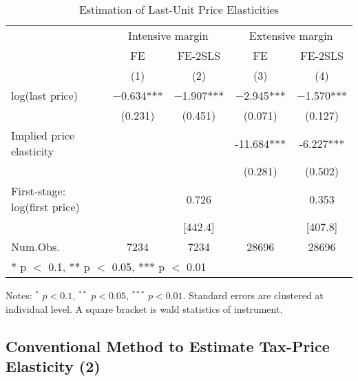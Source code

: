 \documentclass[
  11pt,
  a4paper,
]{article}
\begin{document}
\begin{table}

\caption{\label{tab:MainElasticity}Estimation of Last-Unit Price Elasticities}
\centering
\fontsize{7}{9}\selectfont
\begin{threeparttable}
\begin{tabular}[t]{lcccc}
\toprule
\multicolumn{1}{c}{ } & \multicolumn{2}{c}{Intensive margin} & \multicolumn{2}{c}{Extensive margin} \\
\cmidrule(l{3pt}r{3pt}){2-3} \cmidrule(l{3pt}r{3pt}){4-5}
\multicolumn{1}{c}{ } & \multicolumn{1}{c}{FE} & \multicolumn{1}{c}{FE-2SLS} & \multicolumn{1}{c}{FE} & \multicolumn{1}{c}{FE-2SLS} \\
\cmidrule(l{3pt}r{3pt}){2-2} \cmidrule(l{3pt}r{3pt}){3-3} \cmidrule(l{3pt}r{3pt}){4-4} \cmidrule(l{3pt}r{3pt}){5-5}
  & (1) & (2) & (3) & (4)\\
\midrule
log(last price) & \num{-0.634}*** & \num{-1.907}*** & \num{-2.945}*** & \num{-1.570}***\\
 & (\num{0.231}) & (\num{0.451}) & (\num{0.071}) & (\num{0.127})\\
\midrule
Implied price elasticity &  &  & -11.684*** & -6.227***\\
 &  &  & (0.281) & (0.502)\\
First-stage: log(first price) &  & 0.726 &  & 0.353\\
 &  & {}[442.4] &  & {}[407.8]\\
Num.Obs. & \num{7234} & \num{7234} & \num{28696} & \num{28696}\\
\bottomrule
\multicolumn{5}{l}{\rule{0pt}{1em}* p $<$ 0.1, ** p $<$ 0.05, *** p $<$ 0.01}\\
\end{tabular}
\begin{tablenotes}
\item Notes: $^{*}$ $p < 0.1$, $^{**}$ $p < 0.05$, $^{***}$ $p < 0.01$. Standard errors are clustered at individual level. A square bracket is wald statistics of instrument.
\end{tablenotes}
\end{threeparttable}
\end{table}

\hypertarget{conventional-method-to-estimate-tax-price-elasticity-2}{%
\subsection{Conventional Method to Estimate Tax-Price Elasticity (2)}\label{conventional-method-to-estimate-tax-price-elasticity-2}}
\end{document}
